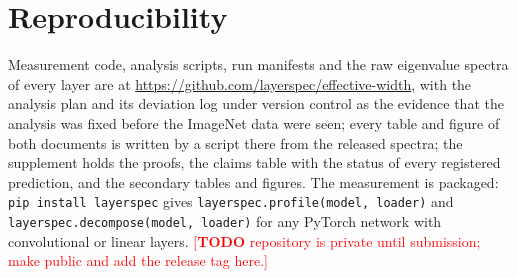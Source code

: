 \documentclass[10pt,journal,compsoc]{IEEEtran}
\newcommand{\todo}[1]{\textcolor{red}{[\textbf{TODO} #1]}}
\begin{document}
\section*{Reproducibility}
\label{sec:repro}
Measurement code, analysis scripts, run manifests and the raw eigenvalue
spectra of every layer are at
\url{https://github.com/layerspec/effective-width}, with the analysis plan
and its deviation log under version control as the evidence that the
analysis was fixed before the ImageNet data were seen; every table and
figure of both documents is written by a script there from the released
spectra; the supplement
holds the proofs, the claims table with the status of every registered
prediction, and the secondary tables and figures. The measurement is
packaged: \texttt{pip install layerspec} gives
\texttt{layerspec.profile(model, loader)} and
\texttt{layerspec.decompose(model, loader)} for any PyTorch network with
convolutional or linear layers.
\todo{repository is private until submission; make public and add the release tag here.}



\end{document}
